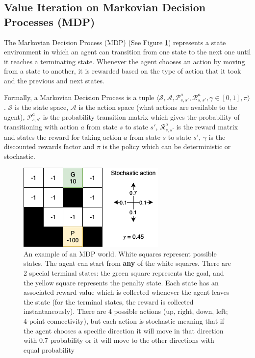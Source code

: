 

\subsection{Value Iteration on Markovian Decision Processes (MDP)} \label{sec:vin}
The Markovian Decision Process (MDP) \cite{szepesvari2010algorithms, satia1973markovian} (See Figure \ref{fig:MDPWorld}) represents a state environment in which an agent can transition from one state to the next one until it reaches a terminating state. Whenever the agent chooses an action by moving from a state to another, it is rewarded based on the type of action that it took and the previous and next states. 

Formally, a Markovian Decision Process is a tuple $\langle\mathcal{S}, \mathcal{A}, \mathcal{P}_{s, s'}^a, \mathcal{R}_{s, s'}^a, \gamma \in [0, 1], \pi \rangle$. $\mathcal{S}$ is the state space, $\mathcal{A}$ is the action space (what actions are available to the agent), $\mathcal{P}_{s, s'}^a$ is the probability transition matrix which gives the probability of transitioning with action $a$ from state $s$ to state $s'$, $\mathcal{R}_{s, s'}^a$ is the reward matrix and states the reward for taking action $a$ from state $s$ to state $s'$, $\gamma$ is the discounted rewards factor and $\pi$ is the policy which can be deterministic or stochastic.

\begin{figure}[h!]
  \centering
  \includegraphics[scale=0.5]{images/MDPWorld.png}
  \caption{An example of an MDP world. White squares represent possible states. The agent can start from \textbf{any} of the white squares. There are 2 special terminal states: the green square represents the goal, and the yellow square represents the penalty state. Each state has an associated reward value which is collected whenever the agent leaves the state (for the terminal states, the reward is collected instantaneously). There are 4 possible actions (up, right, down, left; 4-point connectivity), but each action is stochastic meaning that if the agent chooses a specific direction it will move in that direction with 0.7 probability or it will move to the other directions with equal probability}
  \label{fig:MDPWorld}
\end{figure}

